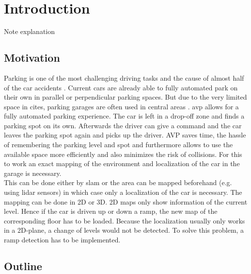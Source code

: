\chapter{Introduction}
\label{ch:Introduction}
Note explanation

\section{Motivation}
Parking is one of the most challenging driving tasks and the cause of almost half of the car accidents \cite{accident}.
Current cars are already able to fully automated park on their own in parallel or perpendicular parking spaces.
But due to the very limited space in cites, parking garages are often used in central areas \cite{Banzhaf2017}.
\gls{avp} allows for a fully automated parking experience.
The car is left in a drop-off zone and finds a parking spot on its own.
Afterwards the driver can give a command and the car leaves the parking spot again and picks up the driver.
AVP saves time, the hassle of remembering the parking level and spot and furthermore allows to use the available space more efficiently and also minimizes the risk of collisions.
For this to work an exact mapping of the environment and localization of the car in the garage is necessary.\\
This can be done either by \gls{slam} or the area can be mapped beforehand (e.g. using \gls{lidar} sensors) in which case only a localization of the car is necessary.
The mapping can be done in 2D or 3D. 2D maps only show information of the current level. Hence if the car is driven up or down a ramp, the new map of the corresponding floor has to be loaded.
Because the localization usually only works in a 2D-plane, a change of levels would not be detected.
To solve this problem, a ramp detection has to be implemented.



\section{Outline}
